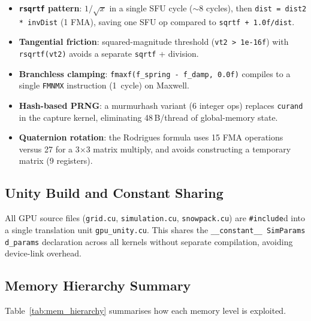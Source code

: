 \begin{itemize}
  \item \textbf{\texttt{rsqrtf} pattern}: $1/\sqrt{x}$ in a single SFU cycle
        ($\sim$8 cycles), then \texttt{dist = dist2 * invDist} (1 FMA), saving
        one SFU op compared to \texttt{sqrtf + 1.0f/dist}.
  \item \textbf{Tangential friction}: squared-magnitude threshold
        (\texttt{vt2 > 1e-16f}) with \texttt{rsqrtf(vt2)} avoids a separate
        \texttt{sqrtf} + division.
  \item \textbf{Branchless clamping}: \texttt{fmaxf(f\_spring - f\_damp, 0.0f)}
        compiles to a single \texttt{FMNMX} instruction (1~cycle) on Maxwell.
  \item \textbf{Hash-based PRNG}: a murmurhash variant (6 integer ops) replaces
        \texttt{curand} in the capture kernel, eliminating 48\,B/thread of
        global-memory state.
  \item \textbf{Quaternion rotation}: the Rodrigues formula uses 15 FMA
        operations versus 27 for a 3$\times$3 matrix multiply, and avoids
        constructing a temporary matrix (9 registers).
\end{itemize}

\subsection{Unity Build and Constant Sharing}
\label{sec:unity}

All GPU source files (\texttt{grid.cu}, \texttt{simulation.cu},
\texttt{snowpack.cu}) are \texttt{\#include}d into a single translation unit
\texttt{gpu\_unity.cu}. This shares the \texttt{\_\_constant\_\_ SimParams
d\_params} declaration across all kernels without separate compilation,
avoiding device-link overhead.

\subsection{Memory Hierarchy Summary}
\label{sec:mem_hierarchy}

Table~\ref{tab:mem_hierarchy} summarises how each memory level is exploited.

